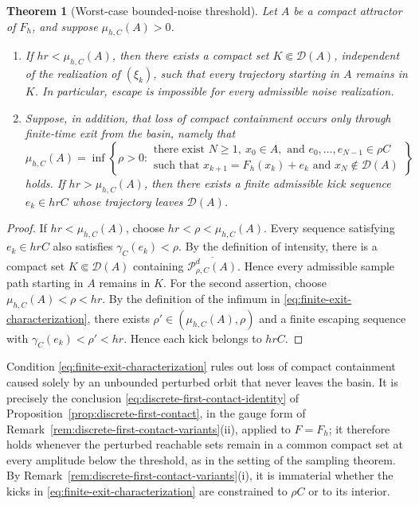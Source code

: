 \documentclass[pdflatex,sn-mathphys-num]{sn-jnl}
\numberwithin{equation}{section}
\theoremstyle{thmstyleone}%
\newtheorem{theorem}{Theorem}[section]
\theoremstyle{definition}
\theoremstyle{remark}
\begin{document}
\begin{theorem}[Worst-case bounded-noise threshold]
\label{thm:bounded-noise-threshold}
Let $A$ be a compact attractor of $F_h$, and suppose $\mu_{h,C}(A)>0$.
\begin{enumerate}
    \item If $hr<\mu_{h,C}(A)$, then there exists a compact set $K\Subset\mathcal D(A)$, independent of the realization of $(\xi_k)$, such that every trajectory starting in $A$ remains in $K$. In particular, escape is impossible for every admissible noise realization.
    \item Suppose, in addition, that loss of compact containment occurs only through finite-time exit from the basin, namely that
    \begin{equation}
        \mu_{h,C}(A)
        =
        \inf\left\{
            \rho>0:
            \begin{array}{l}
            \text{there exist }N\geq1,\ x_0\in A,\text{ and }
            e_0,\ldots,e_{N-1}\in\rho C\\
            \text{such that }x_{k+1}=F_h(x_k)+e_k
            \text{ and }x_N\notin\mathcal D(A)
            \end{array}
        \right\}
        \label{eq:finite-exit-characterization}
    \end{equation}
    holds. If $hr>\mu_{h,C}(A)$, then there exists a finite admissible kick sequence $e_k\in hrC$ whose trajectory leaves $\mathcal D(A)$.
\end{enumerate}
\end{theorem}

\begin{proof}
If $hr<\mu_{h,C}(A)$, choose $hr<\rho<\mu_{h,C}(A)$. Every sequence satisfying $e_k\in hrC$ also satisfies $\gamma_C(e_k)<\rho$. By the definition of intensity, there is a compact set $K\Subset\mathcal D(A)$ containing $\overline{\mathcal P^d_{\rho,C}(A)}$. Hence every admissible sample path starting in $A$ remains in $K$. For the second assertion, choose $\mu_{h,C}(A)<\rho<hr$. By the definition of the infimum in \eqref{eq:finite-exit-characterization}, there exists $\rho'\in(\mu_{h,C}(A),\rho)$ and a finite escaping sequence with $\gamma_C(e_k)<\rho'<hr$. Hence each kick belongs to $hrC$.
\end{proof}

Condition \eqref{eq:finite-exit-characterization} rules out loss of compact containment caused solely by an unbounded perturbed orbit that never leaves the basin. It is precisely the conclusion \eqref{eq:discrete-first-contact-identity} of Proposition~\ref{prop:discrete-first-contact}, in the gauge form of Remark~\ref{rem:discrete-first-contact-variants}(ii), applied to $F=F_h$; it therefore holds whenever the perturbed reachable sets remain in a common compact set at every amplitude below the threshold, as in the setting of the sampling theorem. By Remark~\ref{rem:discrete-first-contact-variants}(i), it is immaterial
whether the kicks in \eqref{eq:finite-exit-characterization} are constrained to $\rho C$ or to its interior.
\end{document}
